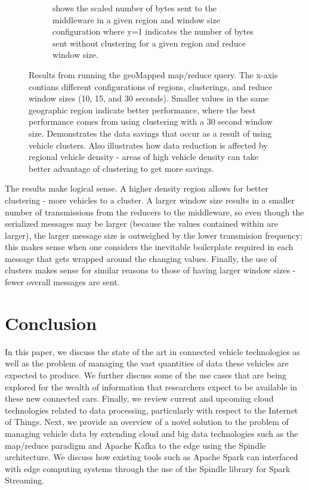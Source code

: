 \documentclass{thesis}
\begin{document}
\begin{figure}
\begin{subfigure}[h]{0.45\textwidth}
            \caption{shows the scaled number of bytes sent to the middleware in a given region and window size
            configuration where y=1 indicates the number of bytes sent without clustering for a given region
            and reduce window size.}
        \end{subfigure}
        \caption{Results from running the geoMapped map/reduce query. The x-axis contians different
            configurations of regions, clusterings, and reduce window sizes (10, 15, and 30 seconds). Smaller
            values in the same geographic region indicate better performance, where the best performance
            comes from using clustering with a 30 second window size. Demonstrates the data savings that occur as a result of using
            vehicle clusters. Also illustrates how data reduction is affected by regional vehicle
            density - areas of high vehicle density can take better advantage of clustering to get more savings.}
        \label{results:geomapped}
    \end{figure}

    The results make logical sense. A higher density region allows for better clustering - more vehicles to a cluster.
    A larger window size results in a smaller number of transmissions from the reducers to the middleware, so even
    though the serialized messages may be larger (because the values contained within are larger), the larger message
    size is outweighed by the lower transmision frequency; this makes sense when one considers the inevitable boilerplate
    required in each message that gets wrapped around the changing values. Finally, the use of clusters makes sense for
    similar reasons to those of having larger window sizes - fewer overall messages are sent.

\chapter{Conclusion}
    In this paper, we discuss the state of the art in connected vehicle technologies as well as the problem
    of managing the vast quantities of data these vehicles are expected to produce. We further discuss
    some of the use cases that are being explored for the wealth of information that researchers expect
    to be available in these new connected cars. Finally, we review current and upcoming cloud technologies
    related to data processing, particularly with respect to the Internet of Things. Next, we provide an
    overview of a novel solution to the problem of managing vehicle data by extending cloud and big data 
    technologies such as the map/reduce paradigm and Apache Kafka to the edge using the Spindle architecture.
    We discuss how existing tools such as Apache Spark can interfaced with edge computing systems through
    the use of the Spindle library for Spark Streaming.
\end{document}
